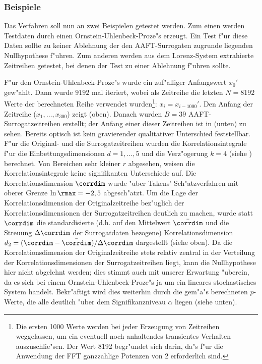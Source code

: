 \subsubsection{Beispiele}
Das Verfahren soll nun an zwei Beispielen getestet werden. Zum einen werden Testdaten
durch einen Ornstein-Uhlenbeck-Proze"s erzeugt. Ein Test f"ur diese Daten sollte zu keiner
Ablehnung der den AAFT-Surrogaten zugrunde liegenden Nullhypothese f"uhren. Zum anderen
werden aus dem Lorenz-System extrahierte Zeitreihen getestet, bei denen der Test zu einer
Ablehnung f"uhren sollte.

F"ur den Ornstein-Uhlenbeck-Proze"s wurde ein zuf"alliger Anfangswert $x_0'$ gew"ahlt.
Dann wurde  $9192$ mal iteriert, wobei als Zeitreihe die letzten $N=8192$
Werte der berechneten Reihe verwendet wurden\footnote{Die ersten 1000 Werte werden bei
  jeder Erzeugung von Zeitreihen weggelassen, um ein eventuell noch anhaltendes
  transientes Verhalten auszuschlie"sen. Der Wert 8192 begr"undet sich darin, da"s f"ur
  die Anwendung der FFT ganzzahlige Potenzen von 2 erforderlich sind. }:
$x_i=x_{i-1000}'$. Den Anfang der Zeitreihe ($x_1,\dots,x_{300}$) zeigt
 (oben). Danach wurden $B=39$ AAFT-Surrogatzeitreihen erstellt; der
Anfang einer dieser Zeitreihen ist in  (unten) zu sehen. Bereits
optisch ist kein gravierender qualitativer Unterschied feststellbar. F"ur die Original-
und die Surrogatzeitreihen wurden die Korrelationsintegrale f"ur die
Einbettungsdimensionen $d=1,\dots,5$ und die Verz"ogerung $k=4$ (siehe
) berechnet. Von Bereichen sehr kleiner $r$ abgesehen, weisen die
Korrelationsintegrale keine signifikanten Unterschiede auf.  Die Korrelationsdimension
$\corrdim$ wurde "uber Takens' Sch"atzverfahren mit oberer Grenze $\ln\rmax=-2,5$
abgesch"atzt. Um die Lage der Korrelationsdimension der Originalzeitreihe bez"uglich der
Korrelationsdimensionen der Surrogatzeitreihen deutlich zu machen, wurde statt $\corrdim$
die standardisierte (d.h. auf den Mittelwert $\bar\corrdim$ und die Streuung
$\Delta\corrdim$ der Surrogatdaten bezogene) Korrelationsdimension
$d_2=(\corrdim-\bar\corrdim)/\Delta\corrdim$ dargestellt (siehe 
oben). Da die Korrelationsdimension der Originalzeitreihe stets relativ zentral in der
Verteilung der Korrelationsdimensionen der Surrogatzeitreihen liegt, kann die
Nullhypothese hier nicht abgelehnt werden; dies stimmt auch mit unserer Erwartung
"uberein, da es sich bei einem Ornstein-Uhlenbeck-Proze"s ja um ein lineares stochastisches 
System handelt. Bekr"aftigt wird dies weiterhin durch die gem"a"s  berechneten
$p$-Werte, die alle deutlich "uber dem Signifikanzniveau $\alpha$ liegen (siehe  unten).


